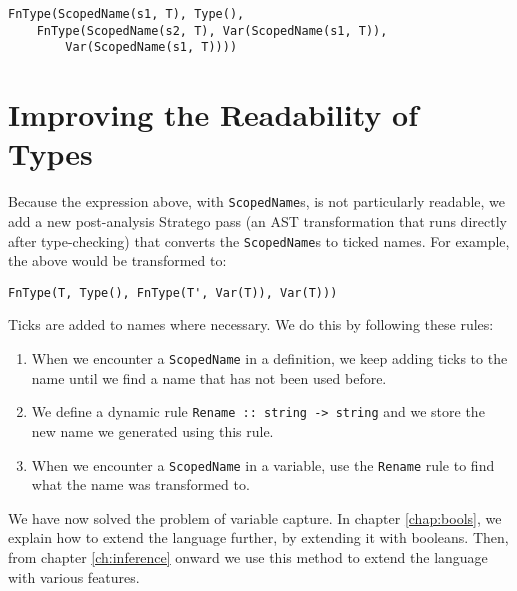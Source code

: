 \begin{lstlisting}
FnType(ScopedName(s1, T), Type(),
	FnType(ScopedName(s2, T), Var(ScopedName(s1, T)), 
		Var(ScopedName(s1, T))))
\end{lstlisting}

\section{Improving the Readability of Types}

Because the expression above, with \verb|ScopedName|s, is not particularly readable, we add a new post-analysis Stratego pass (an AST transformation that runs directly after type-checking) that converts the \verb|ScopedName|s to ticked names. For example, the above would be transformed to:

\begin{lstlisting}
FnType(T, Type(), FnType(T', Var(T)), Var(T)))
\end{lstlisting}
Ticks are added to names where necessary. We do this by following these rules:

\begin{enumerate}
	\item When we encounter a \verb|ScopedName| in a definition, we keep adding ticks to the name until we find a name that has not been used before. 
	\item We define a dynamic rule \verb|Rename :: string -> string| and we store the new name we generated using this rule.
	\item When we encounter a \verb|ScopedName| in a variable, use the \verb|Rename| rule to find what the name was transformed to.
\end{enumerate}

We have now solved the problem of variable capture. In chapter \ref{chap:bools}, we explain how to extend the language further, by extending it with booleans. Then, from chapter \ref{ch:inference} onward we use this method to extend the language with various features.
